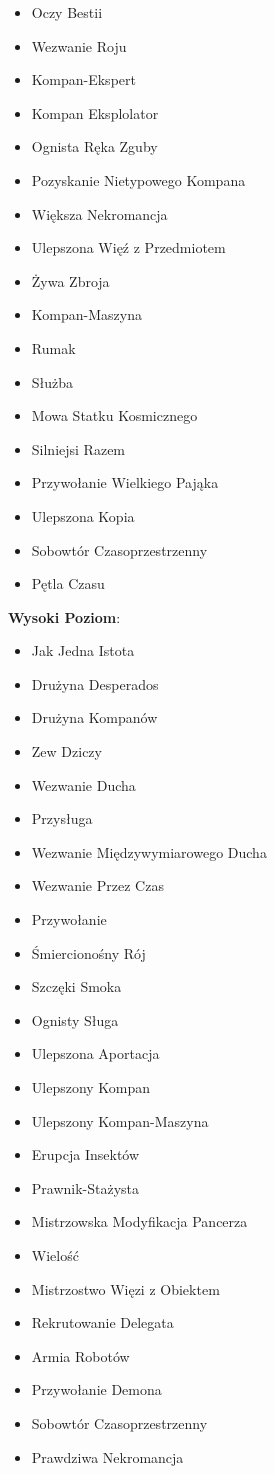 \begin{itemize}
\item Oczy Bestii
\item Wezwanie Roju
\item Kompan-Ekspert
\item Kompan Eksplolator
\item Ognista Ręka Zguby
\item Pozyskanie Nietypowego Kompana
\item Większa Nekromancja
\item Ulepszona Więź z Przedmiotem
\item Żywa Zbroja
\item Kompan-Maszyna
\item Rumak
\item Służba
\item Mowa Statku Kosmicznego
\item Silniejsi Razem
\item Przywołanie Wielkiego Pająka
\item Ulepszona Kopia
\item Sobowtór Czasoprzestrzenny
\item Pętla Czasu
\end{itemize}    
    
\textbf{Wysoki Poziom}:

\begin{itemize}
\item Jak Jedna Istota
\item Drużyna Desperados
\item Drużyna Kompanów
\item Zew Dziczy
\item Wezwanie Ducha
\item Przysługa
\item Wezwanie Międzywymiarowego Ducha
\item Wezwanie Przez Czas
\item Przywołanie
\item Śmiercionośny Rój
\item Szczęki Smoka
\item Ognisty Sługa
\item Ulepszona Aportacja
\item Ulepszony Kompan
\item Ulepszony Kompan-Maszyna
\item Erupcja Insektów
\item Prawnik-Stażysta
\item Mistrzowska Modyfikacja Pancerza
\item Wielość
\item Mistrzostwo Więzi z Obiektem
\item Rekrutowanie Delegata
\item Armia Robotów
\item Przywołanie Demona
\item Sobowtór Czasoprzestrzenny
\item Prawdziwa Nekromancja
\end{itemize}

